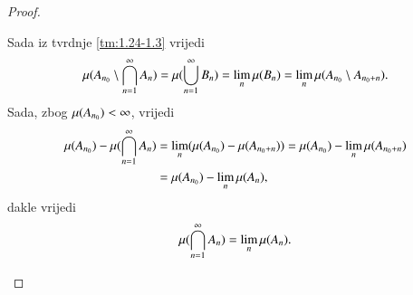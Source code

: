 \begin{proof}
\begin{enumerate}[label={(\roman*)}]
\begin{equation*}
            \end{equation*}
            Sada iz tvrdnje \ref{tm:1.24-1.3} vrijedi
            \begin{equation*}
                \mu({A_{n_0} \setminus
            \bigcap\limits_{n=1}^{\infty} A_n}) = \mu({\bigcup\limits_{n=1}^{\infty} B_n})
            = \lim\limits_{n} \mu({B_n}) = \lim\limits_{n} \mu({A_{n_0} \setminus
            A_{n_0+n}}).
            \end{equation*}
            Sada, zbog $\mu({A_{n_0}}) < \infty$, vrijedi
            \begin{equation*}
                \begin{aligned}
                    \mu({A_{n_0}}) - \mu({\bigcap\limits_{n=1}^{\infty} A_n}) &= \lim\limits_{n} (\mu({A_{n_0}}) - \mu({A_{n_0+n}})) = \mu({A_{n_0}}) - \lim\limits_{n} \mu({A_{n_0+n}})\\
                    &= \mu({A_{n_0}}) - \lim\limits_{n} \mu({A_n}),
                \end{aligned}
            \end{equation*}
            dakle vrijedi
            \begin{equation*}
                \mu({\bigcap\limits_{n=1}^{\infty} A_n}) = \lim\limits_{n} \mu({A_n}).
            \end{equation*}
    \end{enumerate}
\end{proof}